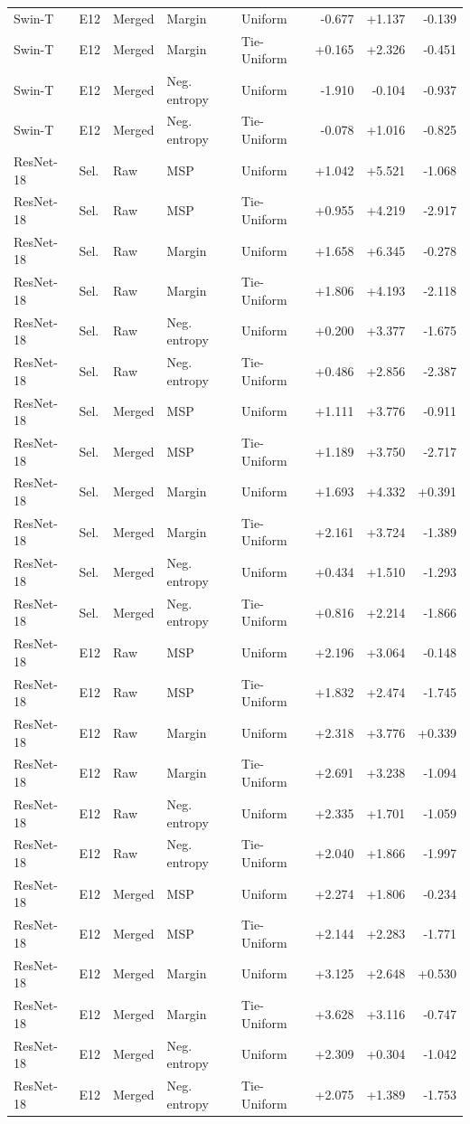 \documentclass[10pt]{article}
\begin{document}
\begin{longtable}{lllllrrr}
Swin-T & E12 & Merged & Margin & Uniform & -0.677 & +1.137 & -0.139\\
Swin-T & E12 & Merged & Margin & Tie-Uniform & +0.165 & +2.326 & -0.451\\
Swin-T & E12 & Merged & Neg. entropy & Uniform & -1.910 & -0.104 & -0.937\\
Swin-T & E12 & Merged & Neg. entropy & Tie-Uniform & -0.078 & +1.016 & -0.825\\
ResNet-18 & Sel. & Raw & MSP & Uniform & +1.042 & +5.521 & -1.068\\
ResNet-18 & Sel. & Raw & MSP & Tie-Uniform & +0.955 & +4.219 & -2.917\\
ResNet-18 & Sel. & Raw & Margin & Uniform & +1.658 & +6.345 & -0.278\\
ResNet-18 & Sel. & Raw & Margin & Tie-Uniform & +1.806 & +4.193 & -2.118\\
ResNet-18 & Sel. & Raw & Neg. entropy & Uniform & +0.200 & +3.377 & -1.675\\
ResNet-18 & Sel. & Raw & Neg. entropy & Tie-Uniform & +0.486 & +2.856 & -2.387\\
ResNet-18 & Sel. & Merged & MSP & Uniform & +1.111 & +3.776 & -0.911\\
ResNet-18 & Sel. & Merged & MSP & Tie-Uniform & +1.189 & +3.750 & -2.717\\
ResNet-18 & Sel. & Merged & Margin & Uniform & +1.693 & +4.332 & +0.391\\
ResNet-18 & Sel. & Merged & Margin & Tie-Uniform & +2.161 & +3.724 & -1.389\\
ResNet-18 & Sel. & Merged & Neg. entropy & Uniform & +0.434 & +1.510 & -1.293\\
ResNet-18 & Sel. & Merged & Neg. entropy & Tie-Uniform & +0.816 & +2.214 & -1.866\\
ResNet-18 & E12 & Raw & MSP & Uniform & +2.196 & +3.064 & -0.148\\
ResNet-18 & E12 & Raw & MSP & Tie-Uniform & +1.832 & +2.474 & -1.745\\
ResNet-18 & E12 & Raw & Margin & Uniform & +2.318 & +3.776 & +0.339\\
ResNet-18 & E12 & Raw & Margin & Tie-Uniform & +2.691 & +3.238 & -1.094\\
ResNet-18 & E12 & Raw & Neg. entropy & Uniform & +2.335 & +1.701 & -1.059\\
ResNet-18 & E12 & Raw & Neg. entropy & Tie-Uniform & +2.040 & +1.866 & -1.997\\
ResNet-18 & E12 & Merged & MSP & Uniform & +2.274 & +1.806 & -0.234\\
ResNet-18 & E12 & Merged & MSP & Tie-Uniform & +2.144 & +2.283 & -1.771\\
ResNet-18 & E12 & Merged & Margin & Uniform & +3.125 & +2.648 & +0.530\\
ResNet-18 & E12 & Merged & Margin & Tie-Uniform & +3.628 & +3.116 & -0.747\\
ResNet-18 & E12 & Merged & Neg. entropy & Uniform & +2.309 & +0.304 & -1.042\\
ResNet-18 & E12 & Merged & Neg. entropy & Tie-Uniform & +2.075 & +1.389 & -1.753\\
\bottomrule\end{longtable}
\end{document}
